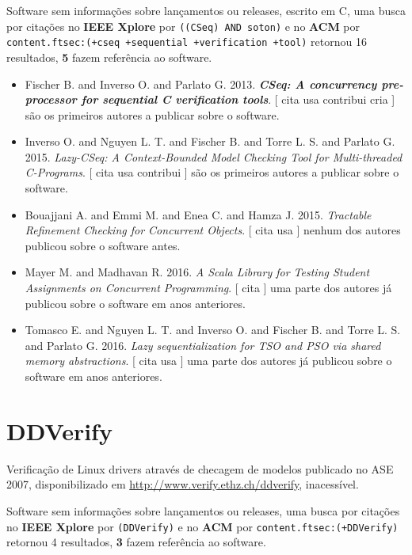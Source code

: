 Software sem informações sobre lançamentos ou releases,
escrito em C,
uma busca por citações no {\bf IEEE Xplore} por
\texttt{((CSeq) AND soton)}
e no {\bf ACM} por
\texttt{content.ftsec:(+cseq +sequential +verification +tool)}
retornou
16 resultados,
{\bf 5} fazem referência ao software.

\begin{itemize}
\item Fischer B. and Inverso O. and Parlato G.
      2013.
        \textbf{\textit{ CSeq: A concurrency pre-processor for sequential C verification tools}}.
      [
          cita
          usa
          contribui
          cria
      ]
são os primeiros autores a publicar sobre o software.
\item Inverso O. and Nguyen L. T. and Fischer B. and Torre L. S. and Parlato G.
      2015.
        \textit{ Lazy-CSeq: A Context-Bounded Model Checking Tool for Multi-threaded C-Programs}.
      [
          cita
          usa
          contribui
      ]
são os primeiros autores a publicar sobre o software.
\item Bouajjani A. and Emmi M. and Enea C. and Hamza J.
      2015.
        \textit{ Tractable Refinement Checking for Concurrent Objects}.
      [
          cita
          usa
      ]
nenhum dos autores publicou sobre o software antes.
\item Mayer M. and Madhavan R.
      2016.
        \textit{ A Scala Library for Testing Student Assignments on Concurrent Programming}.
      [
          cita
      ]
uma parte dos autores já publicou sobre o software em anos anteriores.
\item Tomasco E. and Nguyen L. T. and Inverso O. and Fischer B. and Torre L. S. and Parlato G.
      2016.
        \textit{ Lazy sequentialization for TSO and PSO via shared memory abstractions}.
      [
          cita
          usa
      ]
uma parte dos autores já publicou sobre o software em anos anteriores.
\end{itemize}
\section{DDVerify}

Verificação de Linux drivers através de checagem de modelos
publicado no ASE 2007,
disponibilizado em \url{http://www.verify.ethz.ch/ddverify},
inacessível.

Software sem informações sobre lançamentos ou releases,
uma busca por citações no {\bf IEEE Xplore} por
\texttt{(DDVerify)}
e no {\bf ACM} por
\texttt{content.ftsec:(+DDVerify)}
retornou
4 resultados,
{\bf 3} fazem referência ao software.

